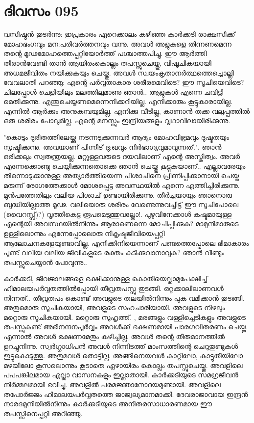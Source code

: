  
\section{ദിവസം 095}


വസിഷ്ഠന്‍ തുടര്‍ന്നു: ഇപ്രകാരം ഏറെക്കാലം കഴിഞ്ഞ കാര്‍ക്കടി രാക്ഷസിക്ക്‌ മോഹഭംഗവും മന:പരിവര്‍ത്തനവും വന്നു. അവള്‍ അളുകളെ തിന്നണമെന്ന തന്റെ മൂഢമോഹത്തെപ്പറ്റിയോര്‍ത്ത്‌ പശ്ചാത്തപിച്ചു. ഈ ആര്‍ത്തി തീരാന്‍വേണ്ടി താന്‍ ആയിരംകൊല്ലം തപസ്സുചെയ്തു, വിഷൂചികയായി അധമജീവിതം നയിക്കുകയും ചെയ്തു. അവള്‍ സ്വയംകൃതാനര്‍ത്ഥത്തെച്ചൊല്ലി വേവലാതി പറഞ്ഞു: എന്റെ പര്‍വ്വതാകാര ശരീരമെവിടെ? ഈ സൂചിയെവിടെ? ചിലപ്പോള്‍ ചെളിയിലും മലത്തിലുമാണു ഞാന്‍.. ആളുകള്‍ എന്നെ ചവിട്ടി മെതിക്കുന്നു. എന്തുചെയ്യണമെന്നെനിക്കറിയില്ല. എനിക്കാരും കൂട്ടുകാരായില്ല. എന്നില്‍ ആര്‍ക്കും അനുകമ്പയുമില്ല. എനിക്കു  വീടില്ല, കാണാന്‍ തക്ക വലുപ്പത്തില്‍ ഒരു ശരീരം പോലുമില്ല. എന്റെ മനസ്സും ഇന്ദ്രിയങ്ങളും വൃഥാവിലായിരിക്കുന്നു. 

"കൊടും ദുരിതത്തിലേയ്ക്കു നടന്നടുക്കുന്നവര്‍ ആദ്യം മോഹവിഭ്രമവും ദുഷ്ടതയും സൃഷ്ടിക്കുന്നു. അവയാണ്‌ പിന്നീട്‌ ദു:ഖവും നിര്‍ഭാഗ്യവുമാവുന്നത്‌.". ഞാന്‍ ഒരിക്കലും സ്വതന്ത്രയല്ല. മറ്റുള്ളവരുടെ ദയവിലാണ്‌ എന്റെ അസ്തിത്വം. അവര്‍ എന്നേക്കൊണ്ടു ചെയ്യിക്കുന്നതൊക്കെ ഞാന്‍ ചെയ്തു കൂട്ടുകയാണ്‌.. എല്ലാവരേയും തിന്നൊടുക്കാനുള്ള അത്യാര്‍ത്തിയെന്ന പിശാചിനെ പ്രീണിപ്പിക്കാനായി ചെയ്ത മരുന്ന് രോഗത്തേക്കാള്‍ മോശപ്പെട്ട അവസ്ഥയില്‍ എന്നെ എത്തിച്ചിരിക്കുന്നു. മുന്‍പത്തേതിലും വലിയ പിശാച്‌ ഉണ്ടായിരിക്കുന്നു. തീര്‍ച്ചയായും ഞാനൊരു ബുദ്ധിയില്ലാത്ത മൂഢ. വലിയൊരു ശരീരം വേണ്ടെന്നുവച്ചിട്ട്‌ ഈ സൂചിപോലെ (വൈറസ്സ്‌)?)  വൃത്തികെട്ട രൂപമെടുത്തുവല്ലോ!. പുഴുവിനേക്കാള്‍ കഷ്ടമായുള്ള എന്റെയീ അവസ്ഥയില്‍നിന്നും ആരാണെന്നെ മോചിപ്പിക്കുക? മാമുനിമാരുടെ ഉള്ളിലൊന്നും എന്നേപ്പോലൊരു നികൃഷ്ടജീവിയെപ്പറ്റി ആലോചനകളേയുണ്ടാവില്ല. എനിക്കിനിയെന്നാണ്‌ പണ്ടത്തെപ്പോലെ ഭീമാകാരം പൂണ്ട്‌ വലിയ വലിയ ജീവികളുടെ രക്തം കുടിക്കുവാനാവുക? ഞാന്‍ വീണ്ടും തപസ്സുചെയ്യാന്‍ പോവുന്നു..

കാര്‍ക്കടി, ജീവജാലങ്ങളെ ഭക്ഷിക്കാനുള്ള കൊതിയെല്ലാമുപേക്ഷിച്ച്‌ ഹിമാലയപര്‍വ്വതത്തില്‍പ്പോയി തീവ്രതപസ്സു തുടങ്ങി. ഒറ്റക്കാലിലാണവള്‍ നിന്നത്‌.. തീവ്രതപം കൊണ്ട്‌ അവളുടെ തലയില്‍നിന്നും പുക വമിക്കാന്‍ തുടങ്ങി. അതുമൊരു സൂചികയായി, അവളുടെ സഹചാരിയായി. അവളുടെ നിഴലും മറ്റൊരു സൂചികയായി. മറ്റൊരു സുഹൃത്ത്‌. , മരങ്ങളും വള്ളിച്ചെടികളും അവളുടെ തപസ്സുകണ്ട്‌ അഭിനന്ദനപൂര്‍വ്വം അവള്‍ക്ക്‌ ഭക്ഷണമായി പാരഗവിതരണം ചെയ്തു. എന്നാല്‍ അവള്‍ ഭക്ഷണമേതും കഴിച്ചില്ല. അവള്‍ തന്റെ തീരുമാനത്തില്‍ ഉറച്ചുനിന്നു. സ്വര്‍ഗ്ഗാധിപന്‍ അവള്‍ നിന്നിടത്ത്‌ മാംസത്തിന്റെ ചെറുതുണ്ടുകള്‍ ഇട്ടുകൊടുത്തു. അതുമവള്‍ തൊട്ടില്ല. അങ്ങിനെയവള്‍ കാറ്റിലോ, കാട്ടുതീയിലോ മഴയിലോ കൂസലൊന്നും കൂടാതെ ഏഴായിരം കൊല്ലം തപസ്സുചെയ്തു. അവളിലെ പപപങ്കിലമായ എല്ലാ വാസനകളും ഇല്ലാതായി. കാര്‍ക്കടിയുടെ സമഗ്രജീവന്‍ നിര്‍മ്മലമായി ഭവിച്ചു. അവളില്‍ പരമജ്ഞാനോദയമുണ്ടായി. അവളിലെ തപോര്‍ജ്ജം ഹിമാലയപര്‍വ്വതത്തെ ജാജ്വല്യമാനമാക്കി. ദേവരാജാവായ ഇന്ദ്രന്‍ നാരദമുനിയില്‍നിന്നും കാര്‍ക്കടിയുടെ അനിതരസാധാരണമായ ഈ തപസ്സിനെപ്പറ്റി അറിഞ്ഞു.

